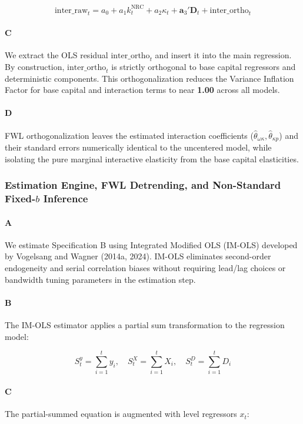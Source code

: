 \[\text{inter\_raw}_t = a_0 + a_1 k_t^{\text{NRC}} + a_2 \kappa_t + \mathbf{a}_3' \mathbf{D}_t + \text{inter\_ortho}_t\]

\paragraph{C}
We extract the OLS residual $\text{inter\_ortho}_t$ and insert it into the main regression. By construction, $\text{inter\_ortho}_t$ is strictly orthogonal to base capital regressors and deterministic components. This orthogonalization reduces the Variance Inflation Factor for base capital and interaction terms to near \textbf{1.00} across all models.

\paragraph{D}
FWL orthogonalization leaves the estimated interaction coefficients ($\hat{\theta}_{\omega\kappa}, \hat{\theta}_{\kappa p}$) and their standard errors numerically identical to the uncentered model, while isolating the pure marginal interactive elasticity from the base capital elasticities.

\subsubsection{Estimation Engine, FWL Detrending, and Non-Standard Fixed-$b$ Inference}

\paragraph{A}
We estimate Specification B using Integrated Modified OLS (IM-OLS) developed by Vogelsang and Wagner (2014a, 2024). IM-OLS eliminates second-order endogeneity and serial correlation biases without requiring lead/lag choices or bandwidth tuning parameters in the estimation step.

\paragraph{B}
The IM-OLS estimator applies a partial sum transformation to the regression model:

\[S_t^y = \sum_{i=1}^t y_i, \quad S_t^X = \sum_{i=1}^t X_i, \quad S_t^D = \sum_{i=1}^t D_i\]

\paragraph{C}
The partial-summed equation is augmented with level regressors $x_t$:

